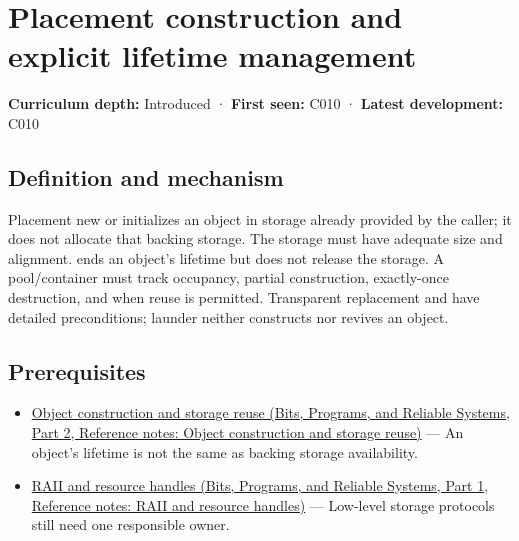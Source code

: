 \hypertarget{appendix-f56c3e43fd4e}{}\label{referencestart:appendix-f56c3e43fd4e}
\section{Placement construction and explicit lifetime management}\label{appendix-f56c3e43fd4e-placement-construction-and-explicit-lifetime-management}

\hypertarget{appendix-f56c3e43fd4e-placement-construction-and-explicit-lifetime-management}{}

\textbf{Curriculum depth:} Introduced · \textbf{First seen:} C010 · \textbf{Latest development:} C010

\begin{allmightroledefinition}

\subsection{Definition and mechanism}\label{appendix-f56c3e43fd4e-definition-and-mechanism}

\hypertarget{appendix-f56c3e43fd4e-definition-and-mechanism}{}

Placement new or  initializes an object in storage already provided by the caller; it does not allocate that backing storage. The storage must have adequate size and alignment.  ends an object's lifetime but does not release the storage. A pool/container must track occupancy, partial construction, exactly-once destruction, and when reuse is permitted. Transparent replacement and  have detailed preconditions; launder neither constructs nor revives an object.

\end{allmightroledefinition}

\subsection{Prerequisites}\label{appendix-f56c3e43fd4e-prerequisites}

\hypertarget{appendix-f56c3e43fd4e-prerequisites}{}

\begin{itemize}
\tightlist
\item
  \href{../01-Bits-Programs-and-Reliable-Systems-P02/main.pdf\#nameddest=appendix-a82f9c438857}{Object construction and storage reuse (Bits, Programs, and Reliable Systems, Part 2, Reference notes: Object construction and storage reuse)} --- An object's lifetime is not the same as backing storage availability.
\item
  \href{../01-Bits-Programs-and-Reliable-Systems-P01/main.pdf\#nameddest=appendix-69739d3ab49b}{RAII and resource handles (Bits, Programs, and Reliable Systems, Part 1, Reference notes: RAII and resource handles)} --- Low-level storage protocols still need one responsible owner.
\end{itemize}

